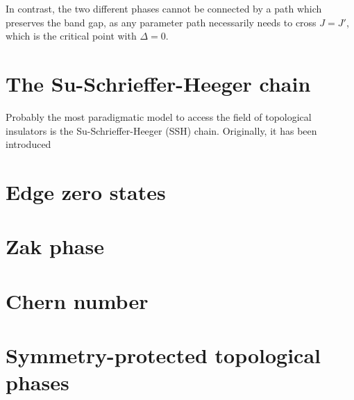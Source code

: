 In contrast, the two different phases cannot be connected by a path which preserves the band gap, as any parameter path necessarily needs to cross $J=J'$, which is the critical point with $\Delta=0$.
%
%
\section{The Su-Schrieffer-Heeger chain}
\label{sec:the_SSH_chain}
%
%
Probably the most paradigmatic model to access the field of topological insulators is the Su-Schrieffer-Heeger (SSH) chain.
Originally, it has been introduced
%
%
\section{Edge zero states}
\label{sec:edge_zero_states}
%
%
%
%
\section{Zak phase}
\label{sec:zak_phase}
%
%
%
%
\section{Chern number}
\label{sec:chern_number}
%
%
%
%
\section{Symmetry-protected topological phases}
\label{sec:symmetry_protected_topological_phases}
%
%
